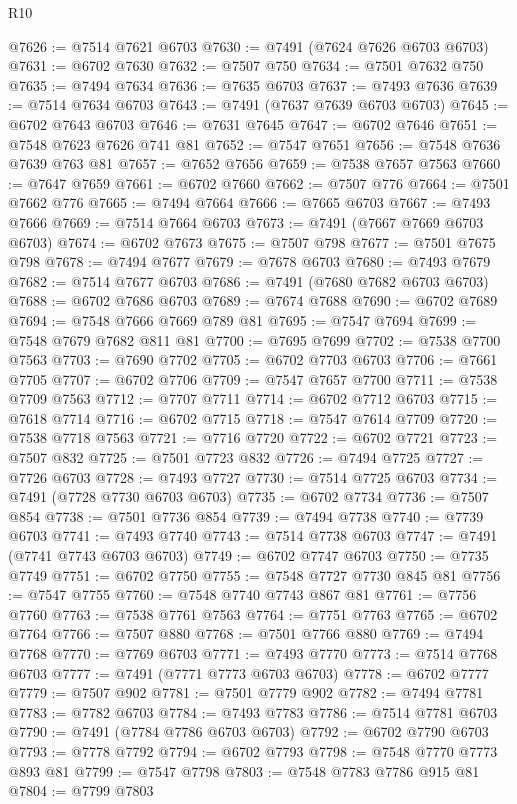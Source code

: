 \begin{lexlean}{R10}
\begin{coremodule}
{{{{{{{{{{{{{{{{{{{{{{{{{{{{{{{{{{{{{{{{{{{{{{{{{{{{{{{{{{{{{{{{{{{{{{{{{{{{{{{{{{{{@7626 := @7514 @7621 @6703
@7630 := @7491 (@7624 @7626 @6703 @6703)
@7631 := @6702 @7630
@7632 := @7507 @750
@7634 := @7501 @7632 @750
@7635 := @7494 @7634
@7636 := @7635 @6703
@7637 := @7493 @7636
@7639 := @7514 @7634 @6703
@7643 := @7491 (@7637 @7639 @6703 @6703)
@7645 := @6702 @7643 @6703
@7646 := @7631 @7645
@7647 := @6702 @7646
@7651 := @7548 @7623 @7626 @741 @81
@7652 := @7547 @7651
@7656 := @7548 @7636 @7639 @763 @81
@7657 := @7652 @7656
@7659 := @7538 @7657 @7563
@7660 := @7647 @7659
@7661 := @6702 @7660
@7662 := @7507 @776
@7664 := @7501 @7662 @776
@7665 := @7494 @7664
@7666 := @7665 @6703
@7667 := @7493 @7666
@7669 := @7514 @7664 @6703
@7673 := @7491 (@7667 @7669 @6703 @6703)
@7674 := @6702 @7673
@7675 := @7507 @798
@7677 := @7501 @7675 @798
@7678 := @7494 @7677
@7679 := @7678 @6703
@7680 := @7493 @7679
@7682 := @7514 @7677 @6703
@7686 := @7491 (@7680 @7682 @6703 @6703)
@7688 := @6702 @7686 @6703
@7689 := @7674 @7688
@7690 := @6702 @7689
@7694 := @7548 @7666 @7669 @789 @81
@7695 := @7547 @7694
@7699 := @7548 @7679 @7682 @811 @81
@7700 := @7695 @7699
@7702 := @7538 @7700 @7563
@7703 := @7690 @7702
@7705 := @6702 @7703 @6703
@7706 := @7661 @7705
@7707 := @6702 @7706
@7709 := @7547 @7657 @7700
@7711 := @7538 @7709 @7563
@7712 := @7707 @7711
@7714 := @6702 @7712 @6703
@7715 := @7618 @7714
@7716 := @6702 @7715
@7718 := @7547 @7614 @7709
@7720 := @7538 @7718 @7563
@7721 := @7716 @7720
@7722 := @6702 @7721
@7723 := @7507 @832
@7725 := @7501 @7723 @832
@7726 := @7494 @7725
@7727 := @7726 @6703
@7728 := @7493 @7727
@7730 := @7514 @7725 @6703
@7734 := @7491 (@7728 @7730 @6703 @6703)
@7735 := @6702 @7734
@7736 := @7507 @854
@7738 := @7501 @7736 @854
@7739 := @7494 @7738
@7740 := @7739 @6703
@7741 := @7493 @7740
@7743 := @7514 @7738 @6703
@7747 := @7491 (@7741 @7743 @6703 @6703)
@7749 := @6702 @7747 @6703
@7750 := @7735 @7749
@7751 := @6702 @7750
@7755 := @7548 @7727 @7730 @845 @81
@7756 := @7547 @7755
@7760 := @7548 @7740 @7743 @867 @81
@7761 := @7756 @7760
@7763 := @7538 @7761 @7563
@7764 := @7751 @7763
@7765 := @6702 @7764
@7766 := @7507 @880
@7768 := @7501 @7766 @880
@7769 := @7494 @7768
@7770 := @7769 @6703
@7771 := @7493 @7770
@7773 := @7514 @7768 @6703
@7777 := @7491 (@7771 @7773 @6703 @6703)
@7778 := @6702 @7777
@7779 := @7507 @902
@7781 := @7501 @7779 @902
@7782 := @7494 @7781
@7783 := @7782 @6703
@7784 := @7493 @7783
@7786 := @7514 @7781 @6703
@7790 := @7491 (@7784 @7786 @6703 @6703)
@7792 := @6702 @7790 @6703
@7793 := @7778 @7792
@7794 := @6702 @7793
@7798 := @7548 @7770 @7773 @893 @81
@7799 := @7547 @7798
@7803 := @7548 @7783 @7786 @915 @81
@7804 := @7799 @7803
}}}}}}}}}}}}}}}}}}}}}}}}}}}}}}}}}}}}}}}}}}}}}}}}}}}}}}}}}}}}}}}}}}}}}}}}}}}}}}}}}}}}
\end{coremodule}
\end{lexlean}
